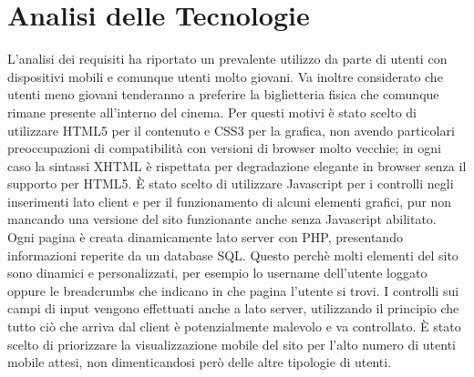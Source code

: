 \documentclass[a4paper, 12pt]{article}
\begin{document}
\section{Analisi delle Tecnologie}
L'analisi dei requisiti ha riportato un prevalente utilizzo da parte di utenti con dispositivi mobili e comunque utenti molto giovani.
Va inoltre considerato che utenti meno giovani tenderanno a preferire la biglietteria fisica che comunque rimane presente all'interno del cinema.
Per questi motivi è stato scelto di utilizzare HTML5 per il contenuto e CSS3 per la grafica, non avendo particolari preoccupazioni di compatibilità con versioni di browser molto vecchie; in ogni caso la sintassi
XHTML è rispettata per degradazione elegante in browser senza il supporto per HTML5.
È stato scelto di utilizzare Javascript per i controlli negli inserimenti lato client e per il funzionamento di alcuni elementi grafici, pur non mancando una versione del sito funzionante anche senza
Javascript abilitato.
Ogni pagina è creata dinamicamente lato server con PHP, presentando informazioni reperite da un database SQL. Questo perchè molti elementi del sito sono dinamici e personalizzati, per esempio lo username dell'utente loggato oppure le breadcrumbs che indicano in che pagina l'utente si trovi.
I controlli sui campi di input vengono effettuati anche a lato server, utilizzando il principio che tutto ciò che arriva dal client è potenzialmente malevolo e va controllato.
È stato scelto di priorizzare la visualizzazione mobile del sito per l'alto numero di utenti mobile attesi, non dimenticandosi però delle altre tipologie di utenti.
\end{document}
